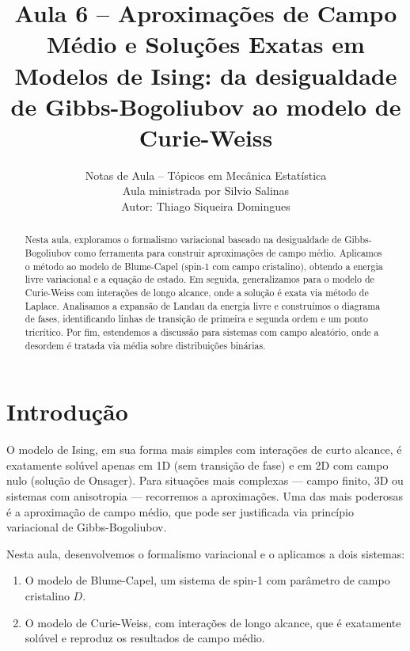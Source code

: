 \documentclass[12pt]{article}
\begin{document}
\title{Aula 6 -- Aproximações de Campo Médio e Soluções Exatas em Modelos de Ising:
da desigualdade de Gibbs-Bogoliubov ao modelo de Curie-Weiss}
\author{Notas de Aula -- Tópicos em Mecânica Estatística \\ Aula ministrada por Silvio Salinas \\ Autor: Thiago Siqueira Domingues}
\date{}

\maketitle

\begin{abstract}
Nesta aula, exploramos o formalismo variacional baseado na desigualdade de Gibbs-Bogoliubov como ferramenta para construir aproximações de campo médio. Aplicamos o método ao modelo de Blume-Capel (spin-1 com campo cristalino), obtendo a energia livre variacional e a equação de estado. Em seguida, generalizamos para o modelo de Curie-Weiss com interações de longo alcance, onde a solução é exata via método de Laplace. Analisamos a expansão de Landau da energia livre e construímos o diagrama de fases, identificando linhas de transição de primeira e segunda ordem e um ponto tricrítico. Por fim, estendemos a discussão para sistemas com campo aleatório, onde a desordem é tratada via média sobre distribuições binárias.
\end{abstract}

\section{Introdução}

O modelo de Ising, em sua forma mais simples com interações de curto alcance, é exatamente solúvel apenas em 1D (sem transição de fase) e em 2D com campo nulo (solução de Onsager). Para situações mais complexas — campo finito, 3D ou sistemas com anisotropia — recorremos a aproximações. Uma das mais poderosas é a aproximação de campo médio, que pode ser justificada via princípio variacional de Gibbs-Bogoliubov.

Nesta aula, desenvolvemos o formalismo variacional e o aplicamos a dois sistemas:
\begin{enumerate}
    \item O modelo de Blume-Capel, um sistema de spin-1 com parâmetro de campo cristalino $D$.
    \item O modelo de Curie-Weiss, com interações de longo alcance, que é exatamente solúvel e reproduz os resultados de campo médio.
\end{enumerate}
\end{document}
